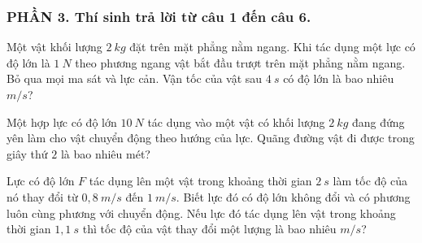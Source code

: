 \subsubsection*{PHẦN 3. Thí sinh trả lời từ câu 1 đến câu 6.}
\setcounter{ex}{0} 
\begin{ex}
Một vật khối lượng $2\ kg$ đặt trên mặt phẳng nằm ngang. Khi tác dụng một lực có độ lớn là $1\ N$ theo phương ngang vật bắt đầu trượt trên mặt phẳng nằm ngang. Bỏ qua mọi ma sát và lực cản. Vận tốc của vật sau $4\ s$ có độ lớn là bao nhiêu $m/s$?
\loigiai{}
\end{ex}
\begin{ex}%
Một hợp lực có độ lớn $10\ N$ tác dụng vào một vật có khối lượng $2\ kg$ đang đứng yên làm cho vật chuyển động theo hướng của lực. Quãng đường vật đi được trong giây thứ $2$ là bao nhiêu mét?
\loigiai{}
\end{ex}
\begin{ex}%
Lực có độ lớn $F$ tác dụng lên một vật trong khoảng thời gian $2\ s$ làm tốc độ của nó thay đổi từ $0,8\ m/s$ đến $1\ m/s$. Biết lực đó có độ lớn không đổi và có phương luôn cùng phương với chuyển động. Nếu lực đó tác dụng lên vật trong khoảng thời gian $1,1\ s$ thì tốc độ của vật thay đổi một lượng là bao nhiêu $m/s$?
  \end{ex}

